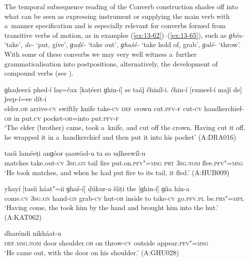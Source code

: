  The temporal subsequence reading of the Converb construction shades off into what can be seen as expressing instrument or supplying the main verb with a~manner specification and is especially relevant for converbs formed from transitive verbs of motion, as in examples (\ref{ex:13-62})--(\ref{ex:13-65}), such as \textit{ɡhín-} `take', \textit{de-} `put, give', \textit{ɡaḍé-} `take out', \textit{ɡhašé-} `take hold of, grab', \textit{ɡalé-} `throw'. With some of these converbs we may very well witness a~further grammaticalisation into postpositions, alternatively, the development of compound verbs (see ). 

\begin{exe}
\ex
\label{ex:13-62}
\gll ɡhaḍeerá phed-í laṣ=čax [kaṭéeri ɡhin-í] se taáǰ čhiníl-i. čhin-í [rumeel-í maǰí de] ǰeep-í=ee dít-i \\
elder.\textsc{ob} arrive-\textsc{cv} swiftly knife take-\textsc{cv} \textsc{def} crown cut.\textsc{pfv-f} cut-\textsc{cv} handkerchief-\textsc{ob} in put.\textsc{cv} pocket-\textsc{ob}=into put.\textsc{pfv-f} \\
\glt `The elder (brother) came, took a~knife, and cut off the crown. Having cut it off, he wrapped it in a~handkerchief and then put it into his pocket' (A:DRA016)

\ex
\label{ex:13-63}
 tasíi laméeṭi anɡóor ṣaawóol-u ta so uḍheewíl-u \\
matches take.out-\textsc{cv} \textsc{3sg.gn} tail fire put.on.\textsc{pfv"=msg}  \textsc{prt } \textsc{3sg.nom} flee.\textsc{pfv"=msg} \\
\glt `He took matches, and when he had put fire to its tail, it fled.' (A:HUB009)

\ex
\label{ex:13-64}
\gll yhayí [tasíi háat"=ii ɡhaš-í] ḍúkur-a šíiṭi the [ɡhin-í] ɡíia hín-a  \\
come.\textsc{cv} \textsc{3sg.gn} hand-\textsc{gn} grab-\textsc{cv} hut-\textsc{ob} inside to  take-\textsc{cv} go.\textsc{pfv.pl} be.\textsc{prs"=mpl} \\
\glt `Having come, the took him by the hand and brought him into the hut.' (A:KAT062)

\ex
\label{ex:13-65}
 dharéndi nikháat-u \\
\textsc{def.msg.nom} door shoulder.\textsc{ob} on throw-\textsc{cv} outside appear.\textsc{pfv"=msg} \\
\glt `He came out, with the door on his shoulder.' (A:GHU028) 
\end{exe}

